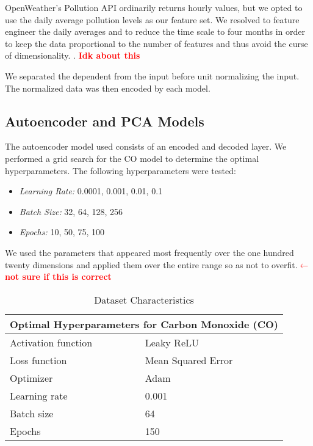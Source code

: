 \documentclass{article}
\newcommand\note[1]{\textbf{\textcolor{red}{#1}}}
\begin{document}
OpenWeather's Pollution API ordinarily returns hourly values, but we opted to use the daily
average pollution levels as our feature set. We resolved to feature engineer the daily 
averages and to reduce the time scale to four months in order to keep the data 
proportional to the number of features and thus avoid the curse of dimensionality. 
\parencite{Trunk79}. \note{Idk about this} \par
We separated the dependent from the input before unit normalizing the input. 
The normalized data was then encoded by each model. 

\subsection{Autoencoder and PCA Models}
The autoencoder model used consists of an encoded and decoded layer. We performed
a grid search for the CO model to determine the optimal hyperparameters. The following 
hyperparameters were tested:
\begin{itemize}
    \item \textit{Learning Rate:} 0.0001, 0.001, 0.01, 0.1
    \item \textit{Batch Size:} 32, 64, 128, 256
    \item \textit{Epochs:} 10, 50, 75, 100
\end{itemize}
We used the parameters that appeared most frequently over the one hundred twenty dimensions and 
applied them over the entire range so as not to overfit.\note{$\leftarrow$ not sure if this is correct}

\begin{table}[h!]
    \caption{Dataset Characteristics}
    \label{tab:table1}
    \vspace{0.1cm}
    \begin{tabular}{p{4cm}p{7cm}}
        \hline
        \multicolumn{2}{c}{Optimal Hyperparameters for Carbon Monoxide (CO)} \\
        \hline
        Activation function & Leaky ReLU \\
        Loss function & Mean Squared Error  \\
        Optimizer & Adam \\
        Learning rate & 0.001 \\
        Batch size & 64 \\
        Epochs & 150 \\ 
        \hline
    \end{tabular}
\end{table}
\end{document}
